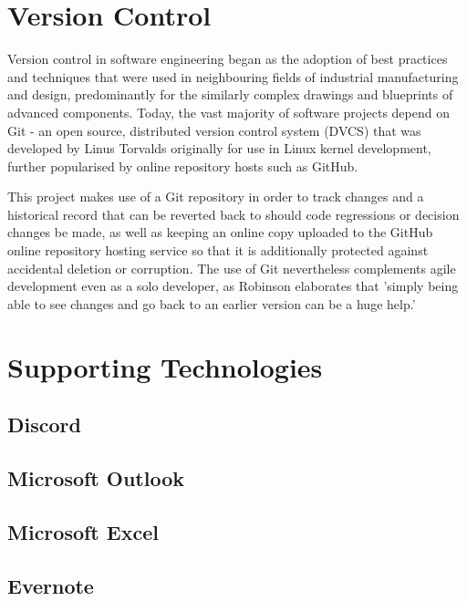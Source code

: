 \section{Version Control}
Version control in software engineering began as the adoption of best practices and techniques that were used in neighbouring fields of industrial manufacturing and design, predominantly for the similarly complex drawings and blueprints of advanced components. \cite{Carstensen1} Today, the vast majority of software projects depend on Git - an open source, distributed version control system (DVCS) that was developed by Linus Torvalds originally for use in Linux kernel development, further popularised by online repository hosts such as GitHub. \cite{LinuxFoundation1}

This project makes use of a Git repository in order to track changes and a historical record that can be reverted back to should code regressions or decision changes be made, as well as keeping an online copy uploaded to the GitHub online repository hosting service so that it is additionally protected against accidental deletion or corruption. The use of Git nevertheless complements agile development even as a solo developer, as Robinson elaborates that 'simply being able to see changes and go back to an earlier version can be a huge help.' \cite{Robinson1}

\section{Supporting Technologies}

\subsection{Discord}

\subsection{Microsoft Outlook}

\subsection{Microsoft Excel}

\subsection{Evernote}
